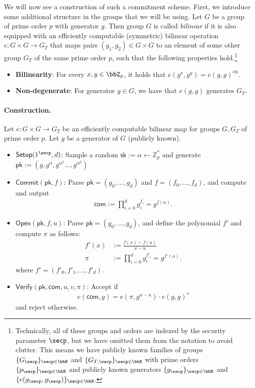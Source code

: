 \documentclass{article}
\newcommand{\Open}{\mathsf{Open}}
\def\Commit{\mathsf{Commit}}
\def\Verify{\mathsf{Verify}}
\def\Setup{\mathsf{Setup}}
\def\pk{\mathsf{pk}}
\def\sk{\mathsf{sk}}
\def\com{\mathsf{com}}
\begin{document}
We will now see a construction of such a commitment scheme. First, we introduce some additional structure in the groups that we will be using. Let $G$ be a group of prime order $p$ with generator $g$. Then group $G$ is called \textit{bilinear} if it is also equipped with an efficiently computable (symmetric) bilinear operation $e: G \times G \to G_T$ that maps pairs $(g_1, g_2) \in G \times G$ to an element of some other group $G_T$ of the same prime order $p$, such that the following properties hold.\footnote{Technically, all of these groups and orders are indexed by the security parameter $\secp$, but we have omitted them from the notation to avoid clutter. This means we have publicly known families of groups $\{G_{\secp}\}_{\secp \in \bbN}$ and $\{G_{T, \secp}\}_{\secp \in \bbN}$ with prime orders $\{p_{\secp}\}_{\secp \in \bbN}$ and publicly known generators $\{g_{\secp}\}_{\secp \in \bbN}$ and $\{e(g_{\secp}, g_{\secp})\}_{\secp \in \bbN}$.}
\begin{itemize}
    \item \textbf{Bilinearity}: For every $x, y \in \bbZ_p$, it holds that $e(g^x, g^y) = e(g, g)^{xy}$.
    \item \textbf{Non-degenerate}: For generator $g \in G$, we have that $e(g, g)$ generates $G_T$.
\end{itemize}

\paragraph{Construction.} Let $e : G \times G \to G_T$ be an efficiently computable bilinear map for groups $G, G_T$ of prime order $p$. Let $g$ be a generator of $G$ (publicly known).
\begin{itemize}
    \item $\Setup(1^\secp, d)$: Sample a random $\sk := \alpha \gets \mathbb{Z}_p^*$ and generate $\pk := (g, g^\alpha, g^{\alpha^2} \ldots, g^{\alpha^d})$
    \item $\Commit(\pk, f)$: Parse $\pk = (g_0, \ldots, g_d)$ and $f = (f_0, \ldots, f_d)$, and compute and output 
    \begin{align*}
        \mathsf{com} :=  \prod_{i = 0}^d g_i^{f_i}  = g^{f(\alpha)}.
    \end{align*}
    \item $\Open(\pk, f, u)$: Parse $\pk = (g_0, \ldots, g_d)$, and define the polynomial $f'$ and compute $\pi$ as follows:
    \begin{align*}
        f'(x) &:= \frac{f(x) - f(u)}{x - u}\\
        \pi &:= \prod_{i = 0}^d g_i^{f'_i} = g^{f'(\alpha)}.
    \end{align*}
    where $f' = (f'_0, f'_1, \ldots, f'_d)$.
    \item $\Verify(\pk, \com, u, v, \pi)$: Accept if 
    \begin{align*}
        e(\com, g) = e(\pi, g^{\alpha - u}) \cdot e(g, g)^{v}
    \end{align*}
    and reject otherwise.
\end{itemize}
\end{document}
